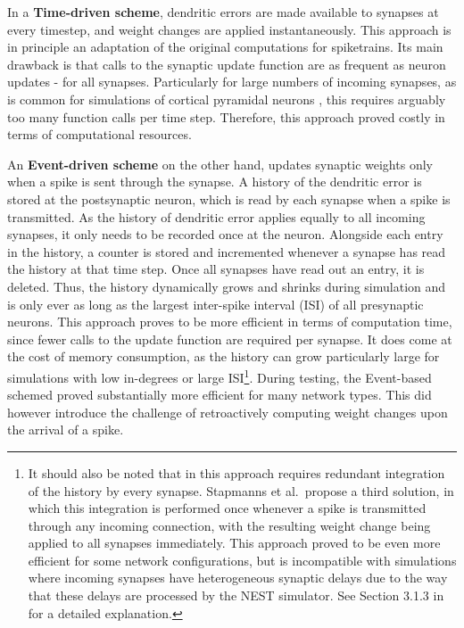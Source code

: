 In a \textbf{Time-driven scheme}, dendritic errors are made available to synapses at every timestep, and weight changes
are applied instantaneously. This approach is in principle an adaptation of the original computations for spiketrains.
Its main drawback is that calls to the synaptic update function are as frequent as neuron updates - for all synapses.
Particularly for large numbers of incoming synapses, as is common for simulations of cortical pyramidal neurons
\citep{potjans2014cell,vezoli2004quantitative}, this requires arguably too many function calls per time step. Therefore,
this approach proved costly in terms of computational resources.

An \textbf{Event-driven scheme} on the other hand, updates synaptic weights only when a spike is sent through the
synapse. A history of the dendritic error is stored at the postsynaptic neuron, which is read by each synapse when a
spike is transmitted. As the history of dendritic error applies equally to all incoming synapses, it only needs to be
recorded once at the neuron. Alongside each entry in the history, a counter is stored and incremented whenever a synapse
has read the history at that time step. Once all synapses have read out an entry, it is deleted. Thus, the history
dynamically grows and shrinks during simulation and is only ever as long as the largest inter-spike interval (ISI) of
all presynaptic neurons. This approach proves to be more efficient in terms of computation time, since fewer calls to
the update function are required per synapse. It does come at the cost of memory consumption, as the history can grow
particularly large for simulations with low in-degrees or large ISI\footnote{It should also be noted that in this
approach requires redundant integration of the history by every synapse. Stapmanns et al.\ propose a third solution, in
which this integration is performed once whenever a spike is transmitted through any incoming connection, with the
resulting weight change being applied to all synapses immediately. This approach proved to be even more efficient for
some network configurations, but is incompatible with simulations where incoming synapses have heterogeneous synaptic
delays due to the way that these delays are processed by the NEST simulator. See Section 3.1.3 in \citep{Stapmanns2021}
for a detailed explanation.}. During testing, the Event-based schemed proved substantially more efficient for many
network types. This did however introduce the challenge of retroactively computing weight changes  upon the arrival of a
spike.


